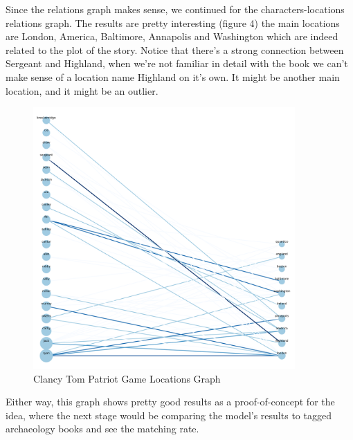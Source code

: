 \documentclass{article}
\begin{document}
Since the relations graph makes sense, we continued for the characters-locations relations graph. The results are pretty interesting (figure 4) the main locations are London, America, Baltimore, Annapolis and Washington which are indeed related to the plot of the story. Notice that there's a strong connection between Sergeant and Highland, when we're not familiar in detail with the book we can't make sense of a location name Highland on it's own. It might be another main location, and it might be an outlier.

\begin{figure}[h]
  \centering
  \includegraphics[width=10cm]{Tom Clancy - Patriot Games locations graph.png}
  \caption{Clancy Tom Patriot Game Locations Graph}
  \label{fig4}
\end{figure}

Either way, this graph shows pretty good results as a proof-of-concept for the idea, where the next stage would be comparing the model's results to tagged archaeology books and see the matching rate.
\end{document}
